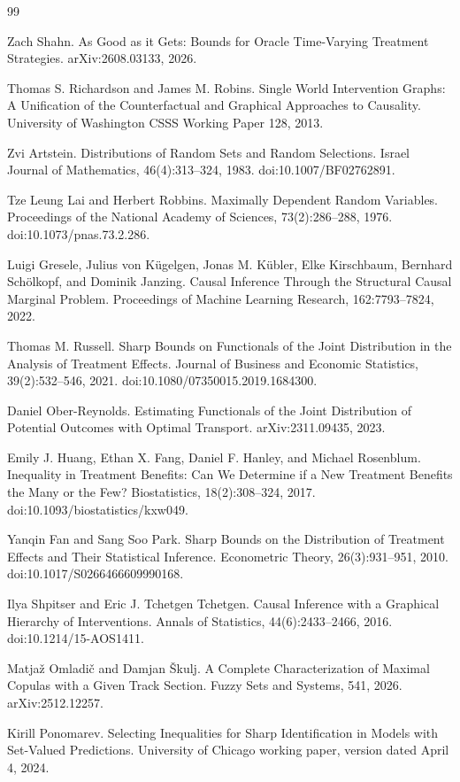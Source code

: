 \documentclass{article}
\begin{document}
\begin{thebibliography}{99}

   Zach Shahn. As Good as it Gets: Bounds for Oracle Time-Varying Treatment Strategies. arXiv:2608.03133, 2026.

   Thomas S. Richardson and James M. Robins. Single World Intervention Graphs: A Unification of the Counterfactual and Graphical Approaches to Causality. University of Washington CSSS Working Paper 128, 2013.

   Zvi Artstein. Distributions of Random Sets and Random Selections. Israel Journal of Mathematics, 46(4):313--324, 1983. doi:10.1007/BF02762891.

   Tze Leung Lai and Herbert Robbins. Maximally Dependent Random Variables. Proceedings of the National Academy of Sciences, 73(2):286--288, 1976. doi:10.1073/pnas.73.2.286.

   Luigi Gresele, Julius von Kügelgen, Jonas M. Kübler, Elke Kirschbaum, Bernhard Schölkopf, and Dominik Janzing. Causal Inference Through the Structural Causal Marginal Problem. Proceedings of Machine Learning Research, 162:7793--7824, 2022.

   Thomas M. Russell. Sharp Bounds on Functionals of the Joint Distribution in the Analysis of Treatment Effects. Journal of Business and Economic Statistics, 39(2):532--546, 2021. doi:10.1080/07350015.2019.1684300.

   Daniel Ober-Reynolds. Estimating Functionals of the Joint Distribution of Potential Outcomes with Optimal Transport. arXiv:2311.09435, 2023.

   Emily J. Huang, Ethan X. Fang, Daniel F. Hanley, and Michael Rosenblum. Inequality in Treatment Benefits: Can We Determine if a New Treatment Benefits the Many or the Few? Biostatistics, 18(2):308--324, 2017. doi:10.1093/biostatistics/kxw049.

   Yanqin Fan and Sang Soo Park. Sharp Bounds on the Distribution of Treatment Effects and Their Statistical Inference. Econometric Theory, 26(3):931--951, 2010. doi:10.1017/S0266466609990168.

   Ilya Shpitser and Eric J. Tchetgen Tchetgen. Causal Inference with a Graphical Hierarchy of Interventions. Annals of Statistics, 44(6):2433--2466, 2016. doi:10.1214/15-AOS1411.

   Matjaž Omladič and Damjan Škulj. A Complete Characterization of Maximal Copulas with a Given Track Section. Fuzzy Sets and Systems, 541, 2026. arXiv:2512.12257.

   Kirill Ponomarev. Selecting Inequalities for Sharp Identification in Models with Set-Valued Predictions. University of Chicago working paper, version dated April 4, 2024.

\end{thebibliography}
\end{document}

